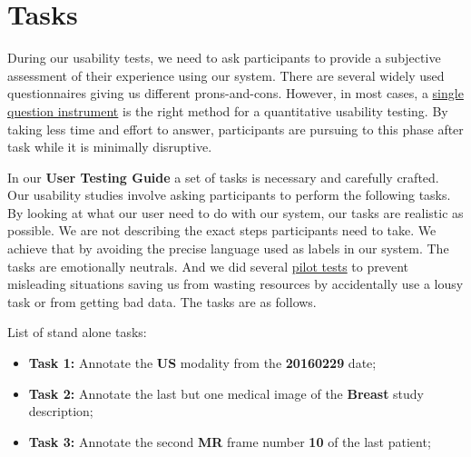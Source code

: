 \section{Tasks}

During our usability tests, we need to ask participants to provide a subjective assessment of their experience using our system. There are several widely used questionnaires giving us different prons-and-cons. However, in most cases, a \hyperlink{https://www.nngroup.com/articles/keep-online-surveys-short/}{single question instrument} \cite{sauro201210} is the right method for a quantitative usability testing. By taking less time and effort to answer, participants are pursuing to this phase after task while it is minimally disruptive.

\clearpage

In our \textbf{User Testing Guide} a set of tasks is necessary and carefully crafted. Our usability studies involve asking participants to perform the following tasks. By looking at what our user need to do with our system, our tasks are realistic as possible. We are not describing the exact steps participants need to take. We achieve that by avoiding the precise language used as labels in our system. The tasks are emotionally neutrals. And we did several \hyperlink{https://www.nngroup.com/articles/pilot-testing/}{pilot tests} to prevent misleading situations saving us from wasting resources by accidentally use a lousy task or from getting bad data. The tasks are as follows.

\hfill


List of stand alone tasks:


\hfill

\begin{itemize}
\item[] \textbf{Task 1:} Annotate the \textbf{US} modality from the \textbf{20160229} date;
\item[] \textbf{Task 2:} Annotate the last but one medical image of the \textbf{Breast} study description;
\item[] \textbf{Task 3:} Annotate the second \textbf{MR} frame number \textbf{10} of the last patient;
\end{itemize}

\hfill


